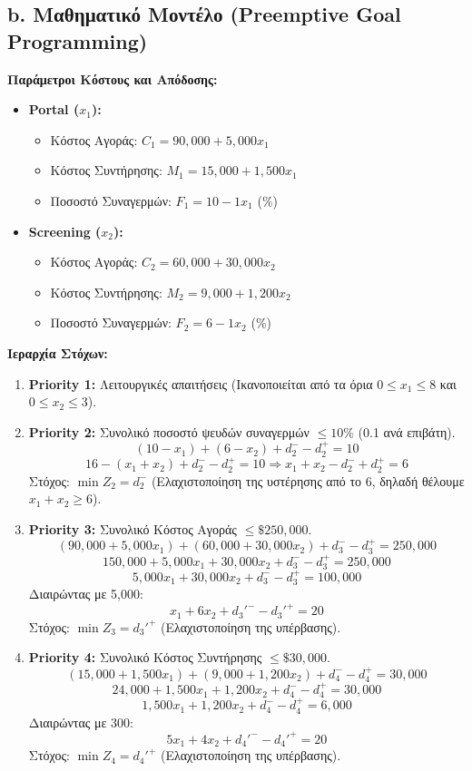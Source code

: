 \documentclass[12pt, a4paper]{article}
\begin{document}
\subsection*{b. Μαθηματικό Μοντέλο (Preemptive Goal Programming)}

\textbf{Παράμετροι Κόστους και Απόδοσης:}
\begin{itemize}
    \item \textbf{Portal ($x_1$):}
    \begin{itemize}
        \item Κόστος Αγοράς: $C_1 = 90,000 + 5,000 x_1$
        \item Κόστος Συντήρησης: $M_1 = 15,000 + 1,500 x_1$
        \item Ποσοστό Συναγερμών: $F_1 = 10 - 1 x_1$ (\%)
    \end{itemize}
    \item \textbf{Screening ($x_2$):}
    \begin{itemize}
        \item Κόστος Αγοράς: $C_2 = 60,000 + 30,000 x_2$
        \item Κόστος Συντήρησης: $M_2 = 9,000 + 1,200 x_2$
        \item Ποσοστό Συναγερμών: $F_2 = 6 - 1 x_2$ (\%)
    \end{itemize}
\end{itemize}

\textbf{Ιεραρχία Στόχων:}

\begin{enumerate}
    \item \textbf{Priority 1:} Λειτουργικές απαιτήσεις (Ικανοποιείται από τα όρια $0 \le x_1 \le 8$ και $0 \le x_2 \le 3$).
    
    \item \textbf{Priority 2:} Συνολικό ποσοστό ψευδών συναγερμών $\le 10\%$ (0.1 ανά επιβάτη).
    $$ (10 - x_1) + (6 - x_2) + d_2^- - d_2^+ = 10 $$
    $$ 16 - (x_1 + x_2) + d_2^- - d_2^+ = 10 \Rightarrow x_1 + x_2 - d_2^- + d_2^+ = 6 $$
    Στόχος: $\min Z_2 = d_2^-$ (Ελαχιστοποίηση της υστέρησης από το 6, δηλαδή θέλουμε $x_1 + x_2 \ge 6$).
    
    \item \textbf{Priority 3:} Συνολικό Κόστος Αγοράς $\le \$250,000$.
    $$ (90,000 + 5,000x_1) + (60,000 + 30,000x_2) + d_3^- - d_3^+ = 250,000 $$
    $$ 150,000 + 5,000x_1 + 30,000x_2 + d_3^- - d_3^+ = 250,000 $$
    $$ 5,000x_1 + 30,000x_2 + d_3^- - d_3^+ = 100,000 $$
    Διαιρώντας με 5,000:
    $$ x_1 + 6x_2 + d_3'^- - d_3'^+ = 20 $$
    Στόχος: $\min Z_3 = d_3'^+$ (Ελαχιστοποίηση της υπέρβασης).

    \item \textbf{Priority 4:} Συνολικό Κόστος Συντήρησης $\le \$30,000$.
    $$ (15,000 + 1,500x_1) + (9,000 + 1,200x_2) + d_4^- - d_4^+ = 30,000 $$
    $$ 24,000 + 1,500x_1 + 1,200x_2 + d_4^- - d_4^+ = 30,000 $$
    $$ 1,500x_1 + 1,200x_2 + d_4^- - d_4^+ = 6,000 $$
    Διαιρώντας με 300:
    $$ 5x_1 + 4x_2 + d_4'^- - d_4'^+ = 20 $$
    Στόχος: $\min Z_4 = d_4'^+$ (Ελαχιστοποίηση της υπέρβασης).
\end{enumerate}
\end{document}
